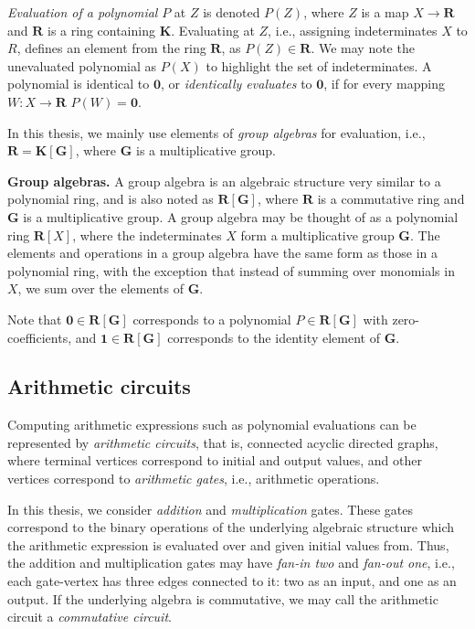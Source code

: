 \emph{Evaluation of a polynomial} $P$ at $Z$ is denoted $P(Z)$, where 
$Z$ is a map $X \to \mathbf{R}$ and $\mathbf{R}$ is a ring containing $\mathbf{K}$. 
Evaluating at $Z$, i.e., assigning indeterminates $X$ to $R$, defines an 
element from the ring $\mathbf{R}$, as $P(Z) \in \mathbf{R}$. We may note the unevaluated 
polynomial as $P(X)$ to highlight the set of indeterminates. 
A polynomial is identical to $\mathbf{0}$, or \emph{identically 
evaluates} to $\mathbf{0}$, if for every mapping $W \colon X \to \mathbf{R}$ $P(W) = \mathbf{0}$.

In this thesis, we mainly use elements of \emph{group algebras} 
for evaluation, i.e., $\mathbf{R} = \mathbf{K}[\mathbf{G}]$, where $\mathbf{G}$ is a 
multiplicative group.

\textbf{Group algebras.} A group algebra is an algebraic structure 
very similar to a polynomial ring, and 
is also noted as $\mathbf{R}[\mathbf{G}]$, where $\mathbf{R}$ is a commutative ring and 
$\mathbf{G}$ is a multiplicative group. A group algebra may be thought of as a 
polynomial ring $\mathbf{R}[X]$, where the indeterminates $X$ form a multiplicative group $\mathbf{G}$. 
The elements and operations in a group algebra have the same form as those in a polynomial ring, 
with the exception that instead of summing over monomials in $X$, 
we sum over the elements of $\mathbf{G}$.

Note that $\mathbf{0} \in \mathbf{R}[\mathbf{G}]$ corresponds to a 
polynomial $P \in \mathbf{R}[\mathbf{G}]$ with zero-coefficients, and 
$\mathbf{1} \in \mathbf{R}[\mathbf{G}]$ corresponds to the identity element of $\mathbf{G}$. 

\subsection{Arithmetic circuits}
\label{sect:prelims_circuits}

Computing arithmetic expressions such as polynomial evaluations 
can be represented by \emph{arithmetic circuits}, that is, 
connected acyclic directed graphs, where terminal vertices correspond to initial and output values, 
and other vertices correspond to \emph{arithmetic gates}, i.e., arithmetic operations. 

In this thesis, we consider \emph{addition} and \emph{multiplication} gates. 
These gates correspond to the binary operations of the underlying algebraic structure 
which the arithmetic expression is evaluated over and given initial values from. Thus, 
the addition and multiplication gates may have \emph{fan-in two} and \emph{fan-out one}, 
i.e., each gate-vertex has three edges connected to it: two as an input, and one as an output. 
If the underlying algebra is commutative, we may call the arithmetic circuit a \emph{commutative circuit}. 

